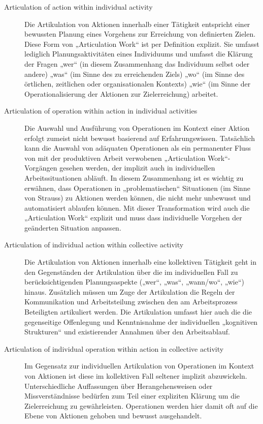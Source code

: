 \begin{description}
	\item[Articulation of action within individual activity] Die Artikulation von Aktionen innerhalb einer Tätigkeit entspricht einer bewussten Planung eines Vorgehens zur Erreichung von definierten Zielen. Diese Form von „Articulation Work“ ist per Definition explizit. Sie umfasst lediglich Planungsaktivitäten eines Individuums und umfasst die Klärung der Fragen „wer“ (in diesem Zusammenhang das Individuum selbst oder andere) „was“ (im Sinne des zu erreichenden Ziels) „wo“ (im Sinne des örtlichen, zeitlichen oder organisationalen Kontexts) „wie“ (im Sinne der Operationalisierung der Aktionen zur Zielerreichung) arbeitet.
	\item[Articulation of operation within action in individual activities] Die Auswahl und Ausführung von Operationen im Kontext einer Aktion erfolgt zumeist nicht bewusst basierend auf Erfahrungswissen. Tatsächlich kann die Auswahl von adäquaten Operationen als ein permanenter Fluss von mit der produktiven Arbeit verwobenen „Articulation Work“-Vorgängen gesehen werden, der implizit auch in individuellen Arbeitssituationen abläuft. In diesem Zusammenhang ist es wichtig zu erwähnen, dass Operationen in „problematischen“ Situationen (im Sinne von Strauss) zu Aktionen werden können, die nicht mehr unbewusst und automatisiert ablaufen können. Mit dieser Transformation wird auch die „Articulation Work“ explizit und muss dass individuelle Vorgehen der geänderten Situation anpassen. 
	\item[Articulation of individual action within collective activity] Die Artikulation von Aktionen innerhalb eine kollektiven Tätigkeit geht in den Gegenständen der Artikulation über die im individuellen Fall zu berücksichtigenden Planungsaspekte („wer“, „was“, „wann/wo“, „wie“) hinaus. Zusätzlich müssen um Zuge der Artikulation die Regeln der Kommunikation und Arbeitsteilung zwischen den am Arbeitsprozess Beteiligten artikuliert werden. Die Artikulation umfasst hier auch die die gegenseitige Offenlegung und Kenntnisnahme der individuellen „kognitiven Strukturen“ und existierender Annahmen über den Arbeitsablauf.
	\item[Articulation of individual operation within action in collective activity] Im Gegensatz zur individuellen Artikulation von Operationen im Kontext von Aktionen ist diese im kollektiven Fall seltener implizit abzuwickeln. Unterschiedliche Auffassungen über Herangehensweisen oder Missverständnisse bedürfen zum Teil einer expliziten Klärung  um die Zielerreichung zu gewährleisten. Operationen werden hier damit oft auf die Ebene von Aktionen gehoben und bewusst ausgehandelt.

\end{description}
